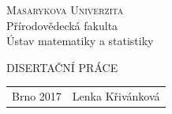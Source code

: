 \documentclass[a4paper,12pt]{report}
\date{\today}
\theoremstyle{definition} \newtheorem{definice}[veta]{Definice}
\theoremstyle{remark}
\begin{document}
\titlepage
\vspace*{-2.4cm}
\begin{center}
\textsc{\Large{Masarykova Univerzita}} \\
\large{Přírodovědecká fakulta} \\
\large{Ústav matematiky a statistiky}
\end{center}
\vspace{7.11cm}
%
\begin{center}
\textsc{\Large{DISERTAČNÍ PRÁCE}}
\end{center}
%
\vspace{11.39cm}
%
\begin{center}
\begin{tabular}{l  r}
 \Large{Brno 2017} \qquad\qquad\qquad\qquad \qquad\qquad & \Large{Lenka Křivánková}
\end{tabular}
\end{center}
\end{document}
